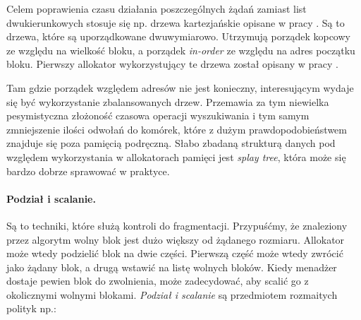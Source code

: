 \documentclass[12pt,a4paper,titlepage,twoside]{mwart}
\begin{document}
Celem poprawienia czasu działania poszczególnych żądań zamiast list
dwukierunkowych stosuje się np. drzewa kartezjańskie opisane w pracy
\cite{vuillemin80unifying}. Są to drzewa, które są uporządkowane dwuwymiarowo.
Utrzymują porządek kopcowy ze względu na wielkość bloku, a porządek
\textit{in-order} ze względu na adres początku bloku. Pierwszy allokator
wykorzystujący te drzewa został opisany w pracy \cite{stephenson83fastfits}.

Tam gdzie porządek względem adresów nie jest konieczny, interesującym wydaje
się być wykorzystanie zbalansowanych drzew. Przemawia za tym niewielka
pesymistyczna złożoność czasowa operacji wyszukiwania i tym samym zmniejszenie
ilości odwołań do komórek, które z dużym prawdopodobieństwem znajduje się poza
pamięcią podręczną. Słabo zbadaną strukturą danych pod względem wykorzystania w
allokatorach pamięci jest \textit{splay tree}, która może się bardzo dobrze
sprawować w praktyce.

\paragraph{Podział i scalanie.} Są to techniki, które służą kontroli do
fragmentacji. Przypuśćmy, że znaleziony przez algorytm wolny blok jest dużo
większy od żądanego rozmiaru. Allokator może wtedy podzielić blok na dwie
części. Pierwszą część może wtedy zwrócić jako żądany blok, a drugą wstawić na
listę wolnych bloków. Kiedy menadżer dostaje pewien blok do zwolnienia, może
zadecydować, aby scalić go z okolicznymi wolnymi blokami. \textit{Podział i
scalanie} są przedmiotem rozmaitych polityk np.:

\vspace{-1ex}
\end{document}
